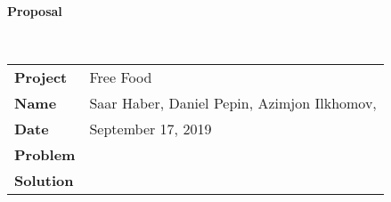 \documentclass[11pt]{article}
\newcommand{\info}{
  \begin{tabular}{l p{6.5in}}
    \textbf{Project}    & Free Food \\ \hdashline
    \textbf{Name}       & Saar Haber, Daniel Pepin, Azimjon Ilkhomov, \\ \hdashline
    \textbf{Date}       & September 17, 2019 \\ \hdashline
    \textbf{Problem}    & \\ \hdashline
    \textbf{Solution}   &  \\
  \end{tabular}
}
\begin{document}
\begin{flushright}\textbf{\large Proposal}\end{flushright}
\ttfamily
~ \\
\info
\end{document}
